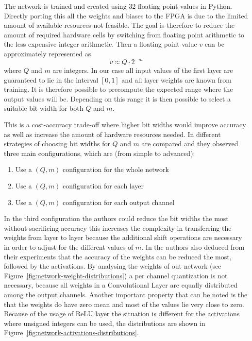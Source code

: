 The network is trained and created using \SI{32}{\bit} floating point values in Python. Directly porting this all the weights and biases to the FPGA is due to the limited amount of available resources not feasible. The goal is therefore to reduce the amount of required hardware cells by switching from floating point arithmetic to the less expensive integer arithmetic. Then a floating point value $v$ can be approximately represented as 
\begin{equation}
	v \approx Q \cdot 2 ^{-m}
\end{equation}
where $Q$ and $m$ are integers. In our case all input values of the first layer are guaranteed to lie in the interval $[0,1]$ and all layer weights are known from training. It is therefore possible to precompute the expected range where the output values will be. Depending on this range it is then possible to select a suitable bit width for both $Q$ and $m$.

This is a cost-accuracy trade-off where higher bit widths would improve accuracy as well as increase the amount of hardware resources needed.
In \cite{Wu:2018aa} different strategies of choosing bit widths for $Q$ and $m$ are compared and they observed three main configurations, which are (from simple to advanced):
\begin{enumerate}
	\item Use a $(Q,m)$ configuration for the whole network
	\item Use a $(Q,m)$ configuration for each layer
	\item Use a $(Q,m)$ configuration for each output channel 
\end{enumerate}
In the third configuration the authors could reduce the bit widths the most without sacrificing accuracy this increases the complexity in transferring the weights from layer to layer because the additional shift operations are necessary in order to adjust for the different values of $m$.
In \cite{Wu:2018aa} the authors also deduced from their experiments that the accuracy of the weights can be reduced the most, followed by the activations. By analysing the weights of out network (see Figure~\ref{fig:network-weight-distributions}) a per channel quantization is not necessary, because all weights in a Convolutional Layer are equally distributed among the output channels. Another important property that can be noted is the that the weights do have zero mean and most of the values lie very close to zero. Because of the usage of ReLU layer the situation is different for the activations where unsigned integers can be used, the distributions are shown in Figure~\ref{fig:network-activations-distributions}.

